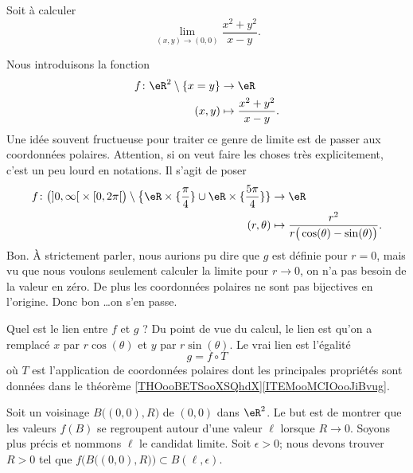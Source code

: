 \begin{example}     \label{EXooSDHDooJzDioW}
	Soit à calculer
	\begin{equation}
		\lim_{(x,y)\to(0,0)}\frac{ x^2+y^2 }{ x-y }.
	\end{equation}

    Nous introduisons la fonction
    \begin{equation}
        \begin{aligned}
            f\colon \eR^2\setminus\{ x=y \}&\to \eR \\
            (x,y)&\mapsto \frac{ x^2+y^2 }{ x-y }. 
        \end{aligned}
    \end{equation}
    Une idée souvent fructueuse pour traiter ce genre de limite est de passer aux coordonnées polaires. Attention, si on veut faire les choses très explicitement, c'est un peu lourd en notations. Il s'agit de poser
    \begin{equation}
        \begin{aligned}
        f\colon \big( \mathopen] 0 , \infty \mathclose[\times\mathopen[ 0 , 2\pi \mathclose[ \big)\setminus\big\{ \eR\times\{ \frac{ \pi }{ 4 }\}\cup\eR\times \{ \frac{ 5\pi }{ 4 } \} \}&\to \eR \\
            (r,\theta)&\mapsto \frac{ r^2 }{ r\big( \cos(\theta)-\sin(\theta) \big) }. 
        \end{aligned}
    \end{equation}
    Bon. À strictement parler, nous aurions pu dire que \( g\) est définie pour \( r=0\), mais vu que nous voulons seulement calculer la limite pour \( r\to 0\), on n'a pas besoin de la valeur en zéro. De plus les coordonnées polaires ne sont pas bijectives en l'origine. Donc bon \ldots on s'en passe.

    Quel est le lien entre \( f\) et \( g \) ? Du point de vue du calcul, le lien est qu'on a remplacé \( x\) par \( r\cos(\theta)\) et \( y\) par \( r\sin(\theta)\). Le vrai lien est l'égalité
    \begin{equation}
        g=f\circ T
    \end{equation}
    où \( T\) est l'application de coordonnées polaires dont les principales propriétés sont données dans le théorème \ref{THOooBETSooXSQhdX}\ref{ITEMooMCIOooJiBvug}.

    Soit un voisinage \( B\big( (0,0), R \big)\) de \( (0,0)\) dans \( \eR^2\). Le but est de montrer que les valeurs \( f(B)\) se regroupent autour d'une valeur \( \ell\) lorsque \( R\to 0\). Soyons plus précis et nommons \( \ell\) le candidat limite. Soit \( \epsilon>0\); nous devons trouver \( R>0\) tel que \( f\Big( B\big( (0,0),R \big) \Big)\subset B(\ell,\epsilon)\).


\end{example}
